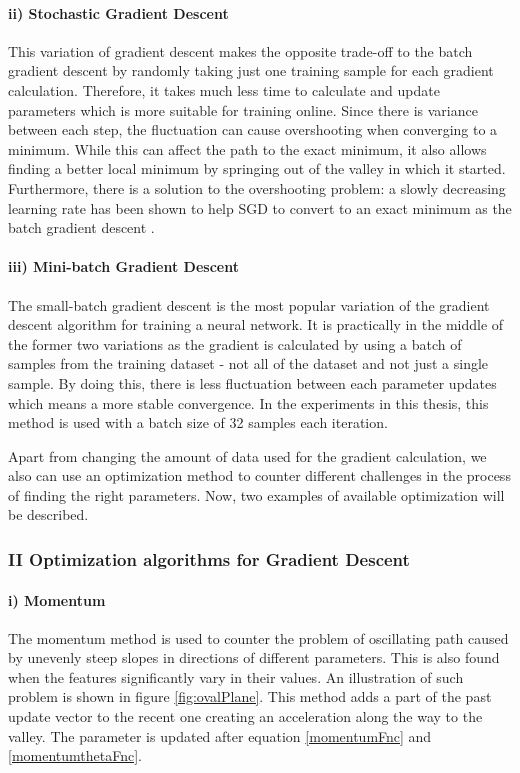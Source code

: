 \paragraph*{ii) Stochastic Gradient Descent} \label{stochGD}This variation of gradient descent makes the opposite trade-off to the batch gradient descent by randomly taking just one training sample for each gradient calculation. Therefore, it takes much less time to calculate and update parameters which is more suitable for training online. Since there is variance between each step, the fluctuation can cause overshooting when converging to a minimum. While this can affect the path to the exact minimum, it also allows finding a better local minimum by springing out of the valley in which it started. Furthermore, there is a solution to the overshooting problem: a slowly decreasing learning rate has been shown to help SGD to convert to an exact minimum as the batch gradient descent \cite{overviewGD}. 

\paragraph*{iii) Mini-batch Gradient Descent} The small-batch gradient descent is the most popular variation of the gradient descent algorithm for training a neural network. It is practically in the middle of the former two variations as the gradient is calculated by using a batch of samples from the training dataset - not all of the dataset and not just a single sample. By doing this, there is less fluctuation between each parameter updates which means a more stable convergence. In the experiments in this thesis, this method is used with a batch size of 32 samples each iteration.

Apart from changing the amount of data used for the gradient calculation, we also can use an optimization method to counter different challenges in the process of finding the right parameters. Now, two examples of available optimization will be described.

\subsubsection*{II Optimization algorithms for Gradient Descent}
\paragraph*{i) Momentum} The momentum method \cite{momentum} is used to counter the problem of oscillating path caused by unevenly steep slopes in directions of different parameters. This is also found when the features significantly vary in their values. An illustration of such problem is shown in figure \ref{fig:ovalPlane}. This method adds a part of the past update vector to the recent one creating an acceleration along the way to the valley. The parameter is updated after equation \eqref{momentumFnc} and \eqref{momentumthetaFnc}.

